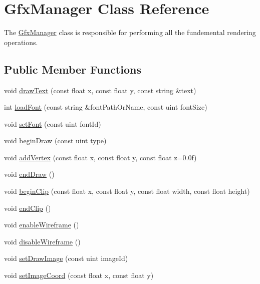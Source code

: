 \hypertarget{class_gfx_manager}{\section{Gfx\-Manager Class Reference}
\label{class_gfx_manager}
}


The \hyperlink{class_gfx_manager}{Gfx\-Manager} class is responsible for performing all the fundemental rendering operations.  


\subsection*{Public Member Functions}
\begin{DoxyCompactItemize}
\item 
void \hyperlink{class_gfx_manager_aa6ccbc512ec8cf842504997c38c0af74}{draw\-Text} (const float x, const float y, const string \&text)
\item 
int \hyperlink{class_gfx_manager_aedd8abb10430bba4bf3d502d223f3d7f}{load\-Font} (const string \&font\-Path\-Or\-Name, const uint font\-Size)
\item 
void \hyperlink{class_gfx_manager_a0a305a97bb623c75cff3b040de911099}{set\-Font} (const uint font\-Id)
\item 
void \hyperlink{class_gfx_manager_aa8a11508d94a874e8deb808978d0e195}{begin\-Draw} (const uint type)
\item 
void \hyperlink{class_gfx_manager_a676fee90e7aad0e9ed1256bcbca368a8}{add\-Vertex} (const float x, const float y, const float z=0.\-0f)
\item 
void \hyperlink{class_gfx_manager_aca0a43412c6d957fdbd9a63ccefb090c}{end\-Draw} ()
\item 
void \hyperlink{class_gfx_manager_a8f5c9321d8dc842082a91d1d587ab090}{begin\-Clip} (const float x, const float y, const float width, const float height)
\item 
void \hyperlink{class_gfx_manager_a888abfcad76bd7d50a40c196762cc438}{end\-Clip} ()
\item 
void \hyperlink{class_gfx_manager_aee23c6443e1ce4b3c6082f622aef6dd9}{enable\-Wireframe} ()
\item 
void \hyperlink{class_gfx_manager_a517348f97e5381e88b5721ebecfabd04}{disable\-Wireframe} ()
\item 
void \hyperlink{class_gfx_manager_a31b702f2aa710b2bc4c7a48e12156ff1}{set\-Draw\-Image} (const uint image\-Id)
\item 
void \hyperlink{class_gfx_manager_a69006b00651a72636f1ae2952ac0b41b}{set\-Image\-Coord} (const float x, const float y)

\end{DoxyCompactItemize}
